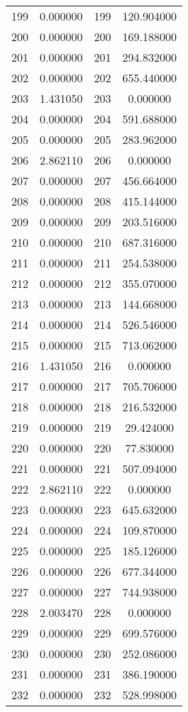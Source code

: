 \documentclass[12pt]{article}
\begin{document}
\begin{longtable}{@{}cccc@{}}
199 & 0.000000 & 199 & 120.904000 \\
200 & 0.000000 & 200 & 169.188000 \\
201 & 0.000000 & 201 & 294.832000 \\
202 & 0.000000 & 202 & 655.440000 \\
203 & 1.431050 & 203 & 0.000000 \\
204 & 0.000000 & 204 & 591.688000 \\
205 & 0.000000 & 205 & 283.962000 \\
206 & 2.862110 & 206 & 0.000000 \\
207 & 0.000000 & 207 & 456.664000 \\
208 & 0.000000 & 208 & 415.144000 \\
209 & 0.000000 & 209 & 203.516000 \\
210 & 0.000000 & 210 & 687.316000 \\
211 & 0.000000 & 211 & 254.538000 \\
212 & 0.000000 & 212 & 355.070000 \\
213 & 0.000000 & 213 & 144.668000 \\
214 & 0.000000 & 214 & 526.546000 \\
215 & 0.000000 & 215 & 713.062000 \\
216 & 1.431050 & 216 & 0.000000 \\
217 & 0.000000 & 217 & 705.706000 \\
218 & 0.000000 & 218 & 216.532000 \\
219 & 0.000000 & 219 & 29.424000 \\
220 & 0.000000 & 220 & 77.830000 \\
221 & 0.000000 & 221 & 507.094000 \\
222 & 2.862110 & 222 & 0.000000 \\
223 & 0.000000 & 223 & 645.632000 \\
224 & 0.000000 & 224 & 109.870000 \\
225 & 0.000000 & 225 & 185.126000 \\
226 & 0.000000 & 226 & 677.344000 \\
227 & 0.000000 & 227 & 744.938000 \\
228 & 2.003470 & 228 & 0.000000 \\
229 & 0.000000 & 229 & 699.576000 \\
230 & 0.000000 & 230 & 252.086000 \\
231 & 0.000000 & 231 & 386.190000 \\
232 & 0.000000 & 232 & 528.998000 \\

\end{longtable}
\end{document}
